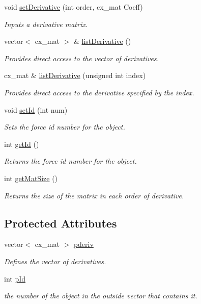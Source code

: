 \begin{DoxyCompactItemize}
void \hyperlink{classmat_force_react_ae800b0a4145b5efc0506a62f3641b4da}{set\-Derivative} (int order, cx\-\_\-mat Coeff)
\begin{DoxyCompactList}\small\item\em Inputs a derivative matrix. \end{DoxyCompactList}\item 
vector$<$ cx\-\_\-mat $>$ \& \hyperlink{classmat_force_react_a52f785374b8e9b6e4d33e0eac95c8622}{list\-Derivative} ()
\begin{DoxyCompactList}\small\item\em Provides direct access to the vector of derivatives. \end{DoxyCompactList}\item 
cx\-\_\-mat \& \hyperlink{classmat_force_react_af05d5675a035a111264a37472e9ba479}{list\-Derivative} (unsigned int index)
\begin{DoxyCompactList}\small\item\em Provides direct access to the derivative specified by the index. \end{DoxyCompactList}\item 
void \hyperlink{classmat_force_react_a778765a5296698179dee923397032756}{set\-Id} (int num)
\begin{DoxyCompactList}\small\item\em Sets the force id number for the object. \end{DoxyCompactList}\item 
int \hyperlink{classmat_force_react_ad6416ceeafeb1f1852911fce0536b7f0}{get\-Id} ()
\begin{DoxyCompactList}\small\item\em Returns the force id number for the object. \end{DoxyCompactList}\item 
int \hyperlink{classmat_force_react_a9e9d9119e2ca2b49d0faea0897f7e300}{get\-Mat\-Size} ()
\begin{DoxyCompactList}\small\item\em Returns the size of the matrix in each order of derivative. \end{DoxyCompactList}\end{DoxyCompactItemize}
\subsection*{Protected Attributes}
\begin{DoxyCompactItemize}
\item 
vector$<$ cx\-\_\-mat $>$ \hyperlink{classmat_force_react_a5db9defc60eb6f70db077c7a3d2df9c3}{pderiv}
\begin{DoxyCompactList}\small\item\em Defines the vector of derivatives. \end{DoxyCompactList}\item 
int \hyperlink{classmat_force_react_af1d3dfa9851be6963b19c2738e3ba241}{p\-Id}
\begin{DoxyCompactList}\small\item\em the number of the object in the outside vector that contains it. \end{DoxyCompactList}\end{DoxyCompactItemize}
